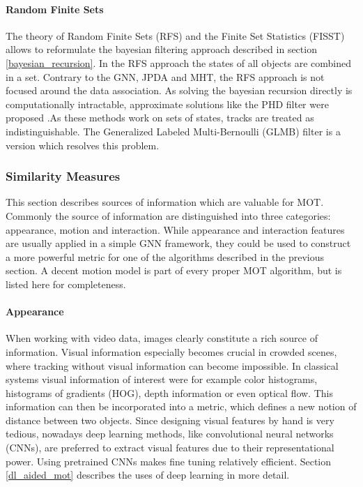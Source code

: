 \documentclass[12pt,a4paper]{article}
\begin{document}
\paragraph{Random Finite Sets} The theory of Random Finite Sets (RFS) and the Finite Set Statistics (FISST) \cite{FISST} allows to reformulate the bayesian filtering approach described in section \ref{bayesian_recursion}. In the RFS approach the states of all objects are combined in a set. Contrary to the GNN, JPDA and MHT, the RFS approach is not focused around the data association. As solving the bayesian recursion directly is computationally intractable, approximate solutions like the PHD filter were proposed \cite{PHD}.As these methods work on sets of states, tracks are treated as indistinguishable. The Generalized Labeled Multi-Bernoulli (GLMB) filter \cite{GLMB}is a version which resolves this problem.

\subsubsection{Similarity Measures} 
\label{similarity}
This section describes sources of information which are valuable for MOT. Commonly the source of information are distinguished into three categories: appearance, motion and interaction.  While appearance and interaction features are usually applied in a simple GNN framework, they could be used to construct a more powerful metric for one of the algorithms described in the previous section. A decent motion model is part of every proper MOT algorithm, but is listed here for completeness.

\paragraph{Appearance} When working with video data, images clearly constitute a rich source of information. Visual information especially becomes crucial in crowded scenes, where tracking without visual information can become impossible. In classical systems visual information of interest were for example color histograms, histograms of gradients (HOG), depth information or even optical flow. This information can then be incorporated into a metric, which defines a new notion of distance between two objects. Since designing visual features by hand is very tedious, nowadays deep learning methods, like convolutional neural networks (CNNs), are preferred to extract visual features due to their representational power. Using pretrained CNNs makes fine tuning relatively efficient. Section \ref{dl_aided_mot} describes the uses of deep learning in more detail.
\end{document}
